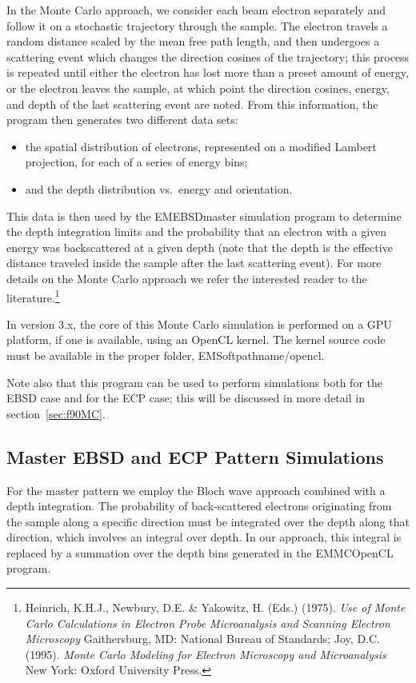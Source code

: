 \documentclass[DIV=calc, paper=letter, fontsize=11pt]{scrartcl}	 %
\begin{document}
In the Monte Carlo approach, we consider each beam electron separately and follow it on a stochastic trajectory 
through the sample.  The electron travels a random distance scaled by the mean free path length, and then undergoes a 
scattering event which changes the direction cosines of the trajectory; this process is repeated until either the electron has
lost more than a preset amount of energy, or the electron leaves the sample, at which point the direction cosines, energy,
and depth of the last scattering event are noted.  From this information, the program then generates two different data sets:
\begin{itemize}
	\item the spatial distribution of electrons, represented on a modified Lambert projection, for each of a series of 
	energy bins;
	\item and the depth distribution vs.\ energy and orientation.
\end{itemize}
This data is then used by the  EMEBSDmaster simulation program to determine the depth integration limits and the probability 
that an electron with a given energy was backscattered at a given depth (note that the depth is the effective distance traveled 
inside the sample after the last scattering event).  For more details on the Monte Carlo approach we refer the interested reader to
the literature.\footnote{Heinrich, K.H.J., Newbury, D.E. \& Yakowitz, H. (Eds.) (1975).
\textit{Use of Monte Carlo Calculations in Electron Probe Microanalysis and Scanning Electron Microscopy} Gaithersburg, MD: National Bureau of Standards;
Joy, D.C. (1995). \textit{Monte Carlo Modeling for Electron Microscopy and Microanalysis} New York: Oxford University Press.}

In version 3.x, the core of this Monte Carlo simulation is performed on a GPU platform, if one is available, using an OpenCL kernel.  The kernel source code 
must be available in the proper folder, EMSoftpathname/opencl.

Note also that this program can be used to perform simulations both for the EBSD case and for the ECP case; this will be discussed in more 
detail in section~\ref{sec:f90MC}.

\subsection{Master EBSD and ECP Pattern Simulations \label{sec:Master}}
For the master pattern we employ the Bloch wave approach combined with a depth integration.  The probability 
of back-scattered electrons originating from the sample along a specific direction must be integrated over the depth
along that direction, which involves an integral over depth.  In our approach, this integral is replaced by a summation
over the depth bins generated in the \textsf{EMMCOpenCL} program.  
\end{document}
